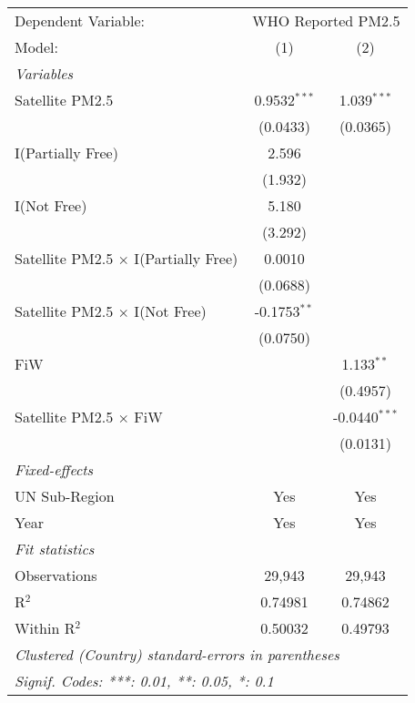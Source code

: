 
\begingroup
\centering
\begin{tabular}{lcc}
   \tabularnewline \midrule \midrule
   Dependent Variable: & \multicolumn{2}{c}{WHO Reported PM2.5}\\
   Model:                                      & (1)            & (2)\\  
   \midrule
   \emph{Variables}\\
   Satellite PM2.5                             & 0.9532$^{***}$ & 1.039$^{***}$\\   
                                               & (0.0433)       & (0.0365)\\   
   I(Partially Free)                           & 2.596          &   \\   
                                               & (1.932)        &   \\   
   I(Not Free)                                 & 5.180          &   \\   
                                               & (3.292)        &   \\   
   Satellite PM2.5 $\times$ I(Partially Free)  & 0.0010         &   \\   
                                               & (0.0688)       &   \\   
   Satellite PM2.5 $\times$ I(Not Free)        & -0.1753$^{**}$ &   \\   
                                               & (0.0750)       &   \\   
   FiW                                         &                & 1.133$^{**}$\\   
                                               &                & (0.4957)\\   
   Satellite PM2.5 $\times$ FiW                &                & -0.0440$^{***}$\\   
                                               &                & (0.0131)\\   
   \midrule
   \emph{Fixed-effects}\\
   UN Sub-Region                               & Yes            & Yes\\  
   Year                                        & Yes            & Yes\\  
   \midrule
   \emph{Fit statistics}\\
   Observations                                & 29,943         & 29,943\\  
   R$^2$                                       & 0.74981        & 0.74862\\  
   Within R$^2$                                & 0.50032        & 0.49793\\  
   \midrule \midrule
   \multicolumn{3}{l}{\emph{Clustered (Country) standard-errors in parentheses}}\\
   \multicolumn{3}{l}{\emph{Signif. Codes: ***: 0.01, **: 0.05, *: 0.1}}\\
\end{tabular}
\par\endgroup


